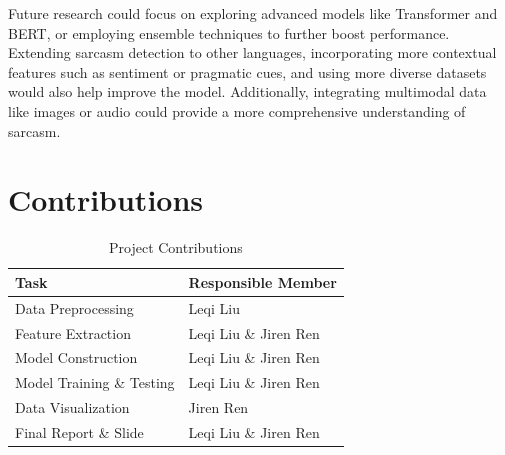 \documentclass[11pt]{article}
\begin{document}
Future research could focus on exploring advanced models like Transformer and BERT, or employing ensemble techniques to further boost performance. Extending sarcasm detection to other languages, incorporating more contextual features such as sentiment or pragmatic cues, and using more diverse datasets would also help improve the model. Additionally, integrating multimodal data like images or audio could provide a more comprehensive understanding of sarcasm.

\section{Contributions}

\begin{table}[ht]
\centering
\begin{tabular}{|l|l|}
\hline
\textbf{Task}              & \textbf{Responsible Member} \\ \hline
Data Preprocessing         & Leqi Liu                    \\ \hline
Feature Extraction         & Leqi Liu \& Jiren Ren       \\ \hline
Model Construction         & Leqi Liu \& Jiren Ren       \\ \hline
Model Training \& Testing  & Leqi Liu \& Jiren Ren       \\ \hline
Data Visualization         & Jiren Ren                   \\ \hline
Final Report \& Slide      & Leqi Liu \& Jiren Ren       \\ \hline
\end{tabular}
\caption{Project Contributions}
\end{table}


%
%
\end{document}

